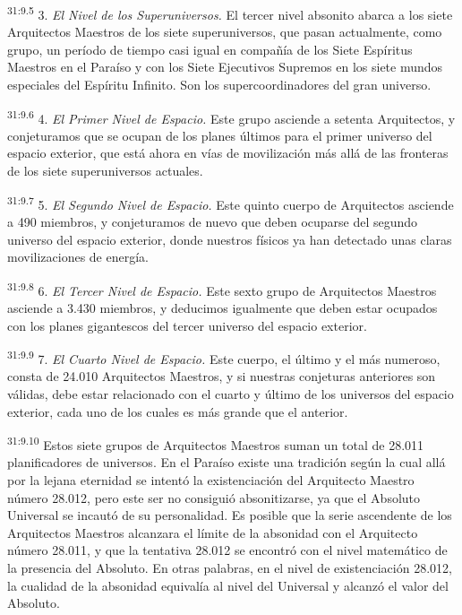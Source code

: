 \par
\textsuperscript{31:9.5} 3. \textit{El Nivel de los Superuniversos.} El tercer nivel absonito abarca a los siete Arquitectos Maestros de los siete superuniversos, que pasan actualmente, como grupo, un período de tiempo casi igual en compañía de los Siete Espíritus Maestros en el Paraíso y con los Siete Ejecutivos Supremos en los siete mundos especiales del Espíritu Infinito. Son los supercoordinadores del gran universo.

\par
\textsuperscript{31:9.6} 4. \textit{El Primer Nivel de Espacio.} Este grupo asciende a setenta Arquitectos, y conjeturamos que se ocupan de los planes últimos para el primer universo del espacio exterior, que está ahora en vías de movilización más allá de las fronteras de los siete superuniversos actuales.

\par
\textsuperscript{31:9.7} 5. \textit{El Segundo Nivel de Espacio.} Este quinto cuerpo de Arquitectos asciende a 490 miembros, y conjeturamos de nuevo que deben ocuparse del segundo universo del espacio exterior, donde nuestros físicos ya han detectado unas claras movilizaciones de energía.

\par
\textsuperscript{31:9.8} 6. \textit{El Tercer Nivel de Espacio.} Este sexto grupo de Arquitectos Maestros asciende a 3.430 miembros, y deducimos igualmente que deben estar ocupados con los planes gigantescos del tercer universo del espacio exterior.

\par
\textsuperscript{31:9.9} 7. \textit{El Cuarto Nivel de Espacio.} Este cuerpo, el último y el más numeroso, consta de 24.010 Arquitectos Maestros, y si nuestras conjeturas anteriores son válidas, debe estar relacionado con el cuarto y último de los universos del espacio exterior, cada uno de los cuales es más grande que el anterior.

\par
\textsuperscript{31:9.10} Estos siete grupos de Arquitectos Maestros suman un total de 28.011 planificadores de universos. En el Paraíso existe una tradición según la cual allá por la lejana eternidad se intentó la existenciación del Arquitecto Maestro número 28.012, pero este ser no consiguió absonitizarse, ya que el Absoluto Universal se incautó de su personalidad. Es posible que la serie ascendente de los Arquitectos Maestros alcanzara el límite de la absonidad con el Arquitecto número 28.011, y que la tentativa 28.012 se encontró con el nivel matemático de la presencia del Absoluto. En otras palabras, en el nivel de existenciación 28.012, la cualidad de la absonidad equivalía al nivel del Universal y alcanzó el valor del Absoluto.

